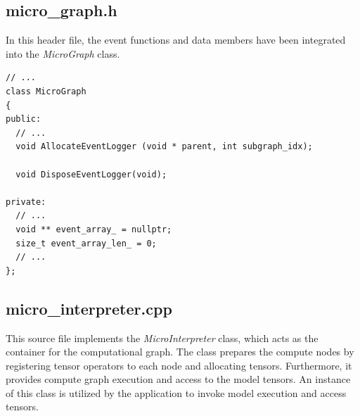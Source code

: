 \subsection*{micro\_graph.h}
In this header file, the event functions and data members have been integrated into the \textit{MicroGraph} class.
\begin{lstlisting}
// ...
class MicroGraph
{
public:
  // ...
  void AllocateEventLogger (void * parent, int subgraph_idx);
  
  void DisposeEventLogger(void);
  
private:
  // ...
  void ** event_array_ = nullptr;
  size_t event_array_len_ = 0;
  // ...
};
\end{lstlisting}

\subsection*{micro\_interpreter.cpp}
This source file implements the \textit{MicroInterpreter} class, which acts as the container for the computational graph. The class prepares the compute nodes by registering tensor operators to each node and allocating tensors. Furthermore, it provides compute graph execution and access to the model tensors. An instance of this class is utilized by the application to invoke model execution and access tensors.


